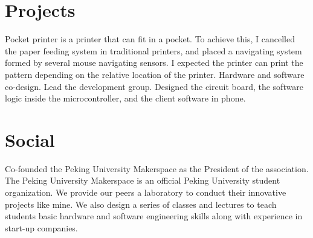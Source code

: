 \documentclass[]{deedy-resume-openfont}
\begin{document}
\begin{minipage}[t]{0.62\textwidth}

\section{Projects}
\descript{}
Pocket printer is a printer that can fit in a pocket. To achieve this, I cancelled the paper feeding system in traditional printers, and placed a navigating system formed by several mouse navigating sensors. I expected the printer can print the pattern depending on the relative location of the printer. Hardware and software co-design. Lead the development group. Designed the circuit board, the software logic inside the microcontroller, and the client software in phone.
\sectionsep


\section{Social}
Co-founded the Peking University Makerspace as the President of the association. The Peking University Makerspace is an official Peking University student organization. We provide our peers a laboratory to conduct their innovative projects like mine. We also design a series of classes and lectures to teach students basic hardware and software engineering skills along with experience in start-up companies.





\end{minipage} 
\end{document}
